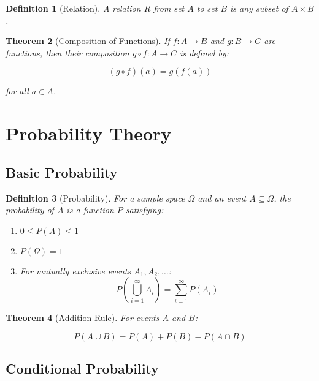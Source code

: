 \documentclass[12pt]{article}
\newif\ifDarkMode
\newcommand{\eqcolor}[1]{\ifDarkMode\textcolor{draculaPurple}{#1}\else#1\fi}
\newcommand{\varcolor}[1]{\ifDarkMode\textcolor{draculaGreen}{#1}\else#1\fi}
\newtheorem{theorem}{Theorem}[section]
\newtheorem{definition}[theorem]{Definition}
\begin{document}
\begin{definition}[Relation]
A relation $\varcolor{R}$ from set $\varcolor{A}$ to set $\varcolor{B}$ is any subset of $\varcolor{A \times B}$.
\end{definition}

\begin{theorem}[Composition of Functions]
If $\varcolor{f: A \to B}$ and $\varcolor{g: B \to C}$ are functions, then their composition $\varcolor{g \circ f: A \to C}$ is defined by:

\[
\eqcolor{(g \circ f)(a) = g(f(a))}
\]

for all $\varcolor{a \in A}$.
\end{theorem}

\section{\textcolor{draculaCyan}{Probability Theory}}

\subsection{\textcolor{draculaYellow}{Basic Probability}}

\begin{definition}[Probability]
For a sample space $\varcolor{\Omega}$ and an event $\varcolor{A \subseteq \Omega}$, the probability of $\varcolor{A}$ is a function $\varcolor{P}$ satisfying:
\begin{enumerate}
    \item $\eqcolor{0 \leq P(A) \leq 1}$
    \item $\eqcolor{P(\Omega) = 1}$
    \item For mutually exclusive events $\varcolor{A_1, A_2, \ldots}$:
    \[
    \eqcolor{P\left(\bigcup_{i=1}^{\infty} A_i\right) = \sum_{i=1}^{\infty} P(A_i)}
    \]
\end{enumerate}
\end{definition}

\begin{theorem}[Addition Rule]
For events $\varcolor{A}$ and $\varcolor{B}$:

\[
\eqcolor{P(A \cup B) = P(A) + P(B) - P(A \cap B)}
\]
\end{theorem}

\subsection{\textcolor{draculaYellow}{Conditional Probability}}
\end{document}
